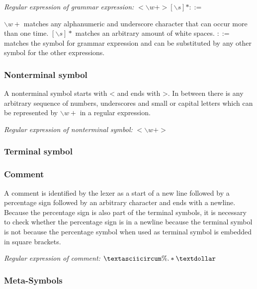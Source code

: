 \textit{Regular expression of grammar expression:}  $<\backslash w+>[\backslash s]*::=$

$\backslash w+$ matches any alphanumeric and underscore character that can occur more than one time.
$[\backslash s]*$ matches an arbitrary amount of white spaces. $::=$ matches the symbol for grammar expression and can be substituted  by any other symbol for the other expressions.

\subsubsection{Nonterminal symbol}

A nonterminal symbol starts with \dq <\dq\; and ends with \dq >\dq. In between there is any arbitrary sequence of numbers, underscores and small or capital letters which can be represented by $\backslash w+$ in a regular expression.

\textit{Regular expression of nonterminal symbol:}  $<\backslash w+>$

\subsubsection{Terminal symbol}


\subsubsection{Comment}

A comment is identified by the lexer as a start of a new line followed by a percentage sign followed by an arbitrary character and ends with a newline. Because the percentage sign is also part of the terminal symbols, it is necessary to check whether the percentage sign is in a newline because the terminal symbol is not because the percentage symbol when used as terminal symbol is embedded in square brackets.    

\textit{Regular expression of comment:}  $\textasciicircum \%.*\textdollar $

\subsubsection{Meta-Symbols}

